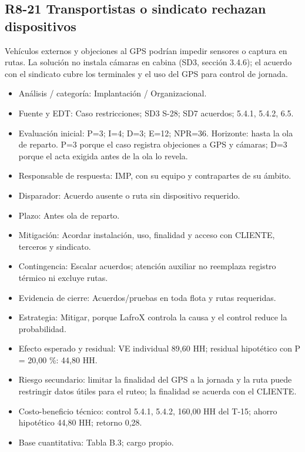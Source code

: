 \subsection*{R8-21 \textemdash{} Transportistas o sindicato rechazan dispositivos}

Vehículos externos y objeciones al GPS podrían impedir sensores o captura en rutas. La solución no instala cámaras en cabina (SD3, sección 3.4.6); el acuerdo con el sindicato cubre los terminales y el uso del GPS para control de jornada.

\begin{itemize}[leftmargin=*,itemsep=3pt]
\item Análisis / categoría: Implantación / Organizacional.
\item Fuente y EDT: Caso restricciones; SD3 S-28; SD7 acuerdos; 5.4.1, 5.4.2, 6.5.
\item Evaluación inicial: P=3; I=4; D=3; E=12; NPR=36. Horizonte: hasta la ola de reparto. P=3 porque el caso registra objeciones a GPS y cámaras; D=3 porque el acta exigida antes de la ola lo revela.
\item Responsable de respuesta: IMP, con su equipo y contrapartes de su ámbito.
\item Disparador: Acuerdo ausente o ruta sin dispositivo requerido.
\item Plazo: Antes ola de reparto.
\item Mitigación: Acordar instalación, uso, finalidad y acceso con CLIENTE, terceros y sindicato.
\item Contingencia: Escalar acuerdos; atención auxiliar no reemplaza registro térmico ni excluye rutas.
\item Evidencia de cierre: Acuerdos/pruebas en toda flota y rutas requeridas.
\item Estrategia: Mitigar, porque LafroX controla la causa y el control reduce la probabilidad.
\item Efecto esperado y residual: VE individual 89,60 HH; residual hipotético con P = 20,00 \%: 44,80 HH.
\item Riesgo secundario: limitar la finalidad del GPS a la jornada y la ruta puede restringir datos útiles para el ruteo; la finalidad se acuerda con el CLIENTE.
\item Costo-beneficio técnico: control 5.4.1, 5.4.2, 160,00 HH del T-15; ahorro hipotético 44,80 HH; retorno 0,28.
\item Base cuantitativa: Tabla B.3; cargo propio.
\end{itemize}

